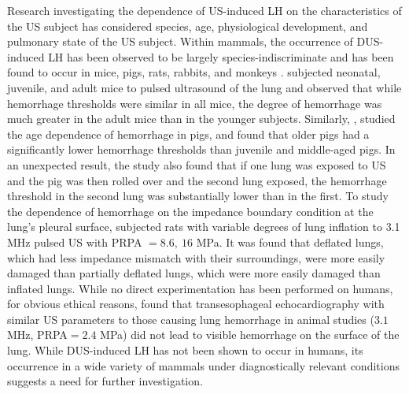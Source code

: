 Research investigating the dependence of \ac{US}-induced \ac{LH} on
the characteristics of the \ac{US} subject has considered species,
age, physiological development, and pulmonary state of the \ac{US}
subject.  Within mammals, the occurrence of \ac{DUS}-induced \ac{LH}
has been observed to be largely species-indiscriminate and has been
found to occur in mice, pigs, rats, rabbits, and monkeys
\citep{Baggs1996, Child1990, Dalecki1997, Frizzell1994, Frizzell2003,
  Harrison1995, Holland1996, Kramer2001, OBrien1997a, OBrien2001b,
  OBrien2003a, OBrien2005, OBrien2000, OBrien2001a, Penney1993a,
  Raeman1993, Raeman1996, Tarantal1994a, Zachary1995a, Zachary2001a,
  Zachary2001}. \cite{Dalecki1997} subjected neonatal, juvenile, and
adult mice to pulsed ultrasound of the lung and observed that while
hemorrhage thresholds were similar in all mice, the degree of
hemorrhage was much greater in the adult mice than in the younger
subjects. Similarly, \cite{OBrien2003a}, studied the age dependence of
hemorrhage in pigs, and found that older pigs had a significantly
lower hemorrhage thresholds than juvenile and middle-aged pigs. In an
unexpected result, the study also found that if one lung was exposed
to \ac{US} and the pig was then rolled over and the second lung
exposed, the hemorrhage threshold in the second lung was substantially
lower than in the first. To study the dependence of hemorrhage on the
impedance boundary condition at the lung’s pleural surface,
\cite{OBrien2002a} subjected rats with variable degrees of lung
inflation to 3.1 MHz pulsed \ac{US} with \ac{PRPA} $=8.6, ~16$ MPa. It was
found that deflated lungs, which had less impedance mismatch with
their surroundings, were more easily damaged than partially deflated
lungs, which were more easily damaged than inflated lungs. While no
direct experimentation has been performed on humans, for obvious
ethical reasons, \cite{Meltzer1998} found that transesophageal
echocardiography with similar \ac{US} parameters to those causing lung
hemorrhage in animal studies ($3.1$ MHz, \ac{PRPA}$= 2.4$ MPa) did not
lead to visible hemorrhage on the surface of the lung. While
\ac{DUS}-induced \ac{LH} has not been shown to occur in humans, its
occurrence in a wide variety of mammals under diagnostically relevant
conditions suggests a need for further investigation.

